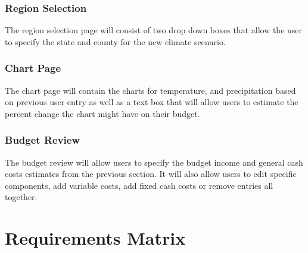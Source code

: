 \documentclass[onecolumn, draftclsnofoot,10pt, compsoc]{article}
\begin{document}
		\subsubsection{Region Selection}
		The region selection page will consist of two drop down boxes that allow the user to specify the state and county for the new climate scenario.
		\subsubsection{Chart Page}
		The chart page will contain the charts for temperature, and precipitation based on previous user entry as well as a text box that will allow users to estimate the percent change the chart might have on their budget.
		\subsubsection{Budget Review}
		The budget review will allow users to specify the budget income and general cash costs estimates from the previous section. It will also allow users to edit specific components, add variable costs, add fixed cash costs or remove entries all together.




\section{Requirements Matrix}
\end{document}
